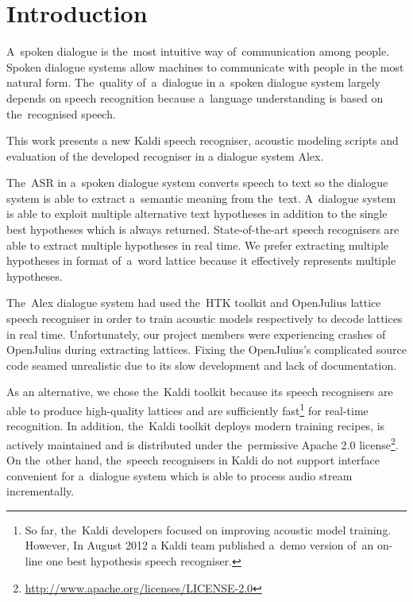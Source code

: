 \chapter{Introduction}
\label{cha:intro}

A~spoken dialogue is the~most intuitive way of~communication among people. 
Spoken dialogue systems allow machines to communicate with people in the most natural form.
The~quality of~a~dialogue in a~spoken dialogue system largely depends on speech recognition because a~language understanding is based on the~recognised speech. 

This work presents a new Kaldi\cite{povey2011kaldi} speech recogniser, acoustic modeling scripts and evaluation of the developed recogniser in a dialogue system Alex\cite{ptics2014url}.

The~\acf{ASR} in a~spoken dialogue system converts speech to text so the dialogue system is able to extract a~semantic meaning from the~text.
A~dialogue system is able to exploit multiple alternative text hypotheses in addition to the single best hypotheses which is always returned. 
State-of-the-art speech recognisers are able to extract multiple hypotheses in real time.
We prefer extracting multiple hypotheses in format of~a~word lattice because it effectively represents multiple hypotheses.

The~Alex dialogue system had used the~\ac{HTK} toolkit\cite{young94htk} and OpenJulius\cite{lee2009julius} lattice speech recogniser in order to train acoustic models respectively to decode lattices in real time. 
Unfortunately, our project members were experiencing crashes of OpenJulius during extracting lattices.
Fixing the OpenJulius's complicated source code seamed unrealistic due to its slow development and lack of documentation.

As an alternative, we chose the~Kaldi toolkit because its speech recognisers are able to produce high-quality lattices and are sufficiently fast\footnote{So far, 
    the~Kaldi developers focused on improving acoustic model training. 
    However, In August 2012 a Kaldi team published a~demo version of~an on-line one best hypothesis speech recogniser.} 
for real-time recognition.\cite{povey2012generating}
In addition, the~Kaldi toolkit deploys modern training recipes, is actively maintained and is distributed under the~permissive Apache 2.0 license\footnote{\url{http://www.apache.org/licenses/LICENSE-2.0}}.
On the~other hand, the~speech recognisers in Kaldi do not support interface convenient for a~dialogue system which is able to process audio stream incrementally.

